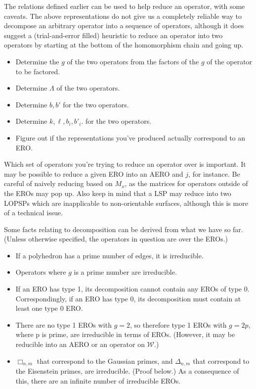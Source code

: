 \documentclass{amsart}[12pt]
\begin{document}
The relations defined earlier can be used to help reduce an operator,
with some caveats. The above representations do not give us a completely
reliable way to decompose an arbitrary operator into a sequence of operators,
although it does suggest a (trial-and-error filled) heuristic to reduce an
operator into two operators by starting at the bottom of the homomorphism chain
and going up.

\begin{itemize}
  \item Determine the $g$ of the two operators from the factors of the
    $g$ of the operator to be factored.
  \item Determine $\Lambda$ of the two operators.
  \item Determine $b, b'$ for the two operators.
  \item Determine $k, \ell, b_i, b'_i$. for the two operators.
  \item Figure out if the representations you've produced
    actually correspond to an ERO.
\end{itemize}

Which set of operators you're trying to reduce an operator over is important.
It may be possible to reduce a given ERO into an AERO and $j$, for instance.
Be careful of naively reducing based on $M_x$, as the matrices for operators
outside of the EROs may pop up. Also keep in mind that a LSP may reduce into
two LOPSPs which are inapplicable to non-orientable surfaces, although this is
more of a technical issue.

Some facts relating to decomposition can be derived from what we have
so far.
(Unless otherwise specified, the operators in question are over the EROs.)

\begin{itemize}
\item If a polyhedron has a prime number of edges, it is irreducible.
\item Operators where $g$ is a prime number are irreducible.
\item If an ERO has type 1, its decomposition cannot contain
any EROs of type 0. Correspondingly, if an ERO has type 0,
its decomposition must contain at least one type 0 ERO.
\item There are no type 1 EROs with $g=2$, so therefore type 1 EROs
  with $g=2p$, where p is prime, are irreducible in terms of EROs.
  (However, it may be reducible into an AERO or an operator on $\mathcal{W}$.)
\item $\Box_{n,m}$ that correspond to the Gaussian primes,
  and $\Delta_{n,m}$ that correspond to the Eisenstein primes,
  are irreducible. (Proof below.)
  As a consequence of this, there are an infinite number of irreducible EROs.
\end{itemize}
\end{document}

